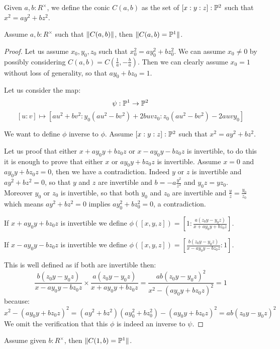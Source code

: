 \begin{definition}
Given $a,b:R^\times$, we define the conic $C(a,b)$ as the set of $[x:y:z]:\mathbb{P}^2$ such that $x^2=ay^2+bz^2$.
\end{definition}

\begin{lemma}\label{pointed-conics-projective}
Assume $a,b:R^\times$ such that $\lVert C(a,b) \rVert$, then $\lVert C(a,b)=\mathbb{P}^1 \rVert$.
\end{lemma}

\begin{proof}
Let us assume $x_0,y_0,z_0$ such that $x_0^2 = ay_0^2+bz_0^2$. We can assume $x_0\not=0$ by possibly considering $C(a,b) = C(\frac{1}{a},-\frac{b}{a})$. Then we can clearly assume $x_0=1$ without loss of generality, so that $ay_0 + bz_0 = 1$.

 Let us consider the map:
\[\psi:\mathbb{P}^1\to \mathbb{P}^2\]
\[[u:v] \mapsto [au^2+bv^2: y_0(au^2-bv^2) + 2buvz_0 : z_0(au^2-bv^2) - 2auvy_0]\]

We want to define $\phi$ inverse to $\phi$. Assume $[x:y:z]:\mathbb{P}^2$ such that $x^2=ay^2+bz^2$. 

Let us proof that either $x+ay_0y+bz_0z$ or $x-ay_0y-bz_0z$ is invertible, to do this it is enough to prove that either $x$ or $ay_0y+bz_0z$ is invertible. Assume $x=0$ and $ay_0y+bz_0z=0$, then we have a contradiction. Indeed $y$ or $z$ is invertible and $ay^2+bz^2=0$, so that $y$ and $z$ are invertible and $b = -a\frac{y^2}{z^2}$ and $y_0z=yz_0$. Moreover $y_0$ or $z_0$ is invertible, so that both $y_0$ and $z_0$ are invertible and $\frac{y}{z} = \frac{y_0}{z_0}$ which means $ay^2+bz^2=0$ implies $ay_0^2+bz_0^2=0$, a contradiction. 

If $x + ay_0y + bz_0z$ is invertible we define $\phi([x,y,z]) = [1:\frac{a(z_0y-y_0z)}{x + ay_0y + bz_0z}]$.

If $x - ay_0y - bz_0z$ is invertible we define $\phi([x,y,z]) = [\frac{b(z_0y-y_0z)}{x - ay_0y - bz_0z}:1]$.

This is well defined as if both are invertible then:
\[\frac{b(z_0y-y_0z)}{x - ay_0y - bz_0z}\times\frac{a(z_0y-y_0z)}{x + ay_0y + bz_0z} = \frac{ab(z_0y-y_0z)^2}{x^2 - (ay_0y + bz_0z)^2} = 1\]
because:
\[x^2 - (ay_0y + bz_0z)^2 = (ay^2+bz^2)(ay_0^2+bz_0^2) - (ay_0y + bz_0z)^2 = ab(z_0y-y_0z)^2\]
We omit the verification that this $\phi$ is indeed an inverse to $\psi$.
\end{proof}


\begin{lemma}\label{conic-one-split}
Assume given $b:R^\times$, then $\lVert C(1,b) = \mathbb{P}^1 \rVert$.
\end{lemma}


